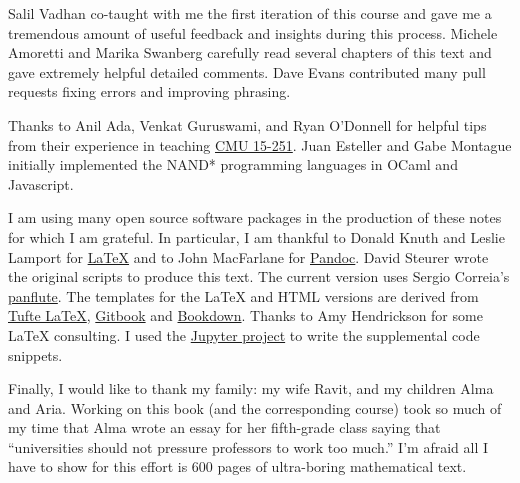 Salil Vadhan co-taught with me the first iteration of this course and
gave me a tremendous amount of useful feedback and insights during this
process. Michele Amoretti and Marika Swanberg carefully read several
chapters of this text and gave extremely helpful detailed comments. Dave
Evans contributed many pull requests fixing errors and improving
phrasing.

Thanks to Anil Ada, Venkat Guruswami, and Ryan O'Donnell for helpful
tips from their experience in teaching
\href{http://www.cs.cmu.edu/~./15251/}{CMU 15-251}. Juan Esteller and
Gabe Montague initially implemented the NAND* programming languages in
OCaml and Javascript.

I am using many open source software packages in the production of these
notes for which I am grateful. In particular, I am thankful to Donald
Knuth and Leslie Lamport for
\href{https://www.latex-project.org/}{LaTeX} and to John MacFarlane for
\href{http://pandoc.org/}{Pandoc}. David Steurer wrote the original
scripts to produce this text. The current version uses Sergio Correia's
\href{http://scorreia.com/software/panflute/}{panflute}. The templates
for the LaTeX and HTML versions are derived from
\href{https://tufte-latex.github.io/tufte-latex/}{Tufte LaTeX},
\href{https://www.gitbook.com/}{Gitbook} and
\href{https://bookdown.org/}{Bookdown}. Thanks to Amy Hendrickson for
some LaTeX consulting. I used the \href{http://jupyter.org/}{Jupyter
project} to write the supplemental code snippets.

Finally, I would like to thank my family: my wife Ravit, and my children
Alma and Aria. Working on this book (and the corresponding course) took
so much of my time that Alma wrote an essay for her fifth-grade class
saying that ``universities should not pressure professors to work too
much.'' I'm afraid all I have to show for this effort is 600 pages of
ultra-boring mathematical text.
